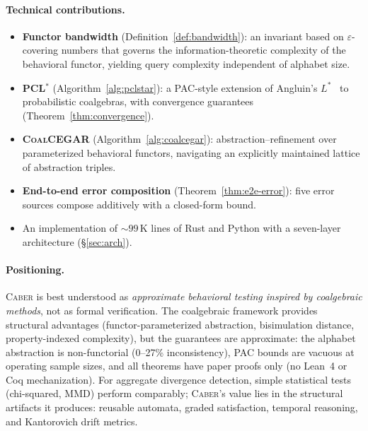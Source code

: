 \documentclass[11pt]{article}
\newcommand{\tool}{\textsc{Caber}}
\newcommand{\pclstar}{PCL$^*$}
\newcommand{\coalcegar}{\textsc{CoalCEGAR}}
\begin{document}
\paragraph{Technical contributions.}
\begin{itemize}[leftmargin=*,nosep]
\item \textbf{Functor bandwidth} (Definition~\ref{def:bandwidth}):
  an invariant based on $\varepsilon$-covering numbers that governs
  the information-theoretic complexity of the behavioral functor,
  yielding query complexity independent of alphabet size.
\item \textbf{\pclstar{}} (Algorithm~\ref{alg:pclstar}): a PAC-style
  extension of Angluin's $L^*$~\cite{angluin1987learning} to
  probabilistic coalgebras, with convergence guarantees
  (Theorem~\ref{thm:convergence}).
\item \textbf{\coalcegar{}} (Algorithm~\ref{alg:coalcegar}):
  abstraction--refinement over parameterized behavioral functors,
  navigating an explicitly maintained lattice of abstraction triples.
\item \textbf{End-to-end error composition}
  (Theorem~\ref{thm:e2e-error}): five error sources compose
  additively with a closed-form bound.
\item An implementation of ${\sim}99$\,K lines of Rust and Python
  with a seven-layer architecture (\S\ref{sec:arch}).
\end{itemize}

\paragraph{Positioning.}
\tool{} is best understood as \emph{approximate behavioral testing
inspired by coalgebraic methods}, not as formal verification.
The coalgebraic framework provides structural advantages
(functor-parameterized abstraction, bisimulation distance,
property-indexed complexity), but the guarantees are approximate:
the alphabet abstraction is non-functorial (0--27\% inconsistency),
PAC bounds are vacuous at operating sample sizes, and all theorems
have paper proofs only (no Lean~4 or Coq mechanization).  For
aggregate divergence detection, simple statistical tests (chi-squared,
MMD) perform comparably; \tool{}'s value lies in the structural
artifacts it produces: reusable automata, graded satisfaction,
temporal reasoning, and Kantorovich drift metrics.

\end{document}

